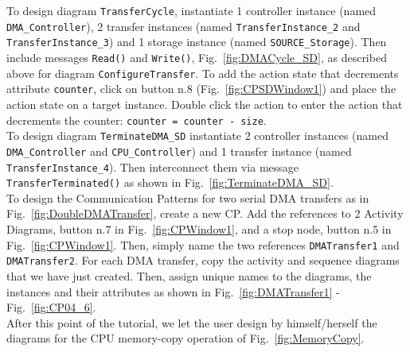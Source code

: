 \documentclass{llncs}
\begin{document}
To design diagram \texttt{TransferCycle}, instantiate 1 controller instance (named \texttt{DMA\_Controller}), 2 transfer
instances (named \texttt{TransferInstance\_2} and \texttt{TransferInstance\_3}) and 1 storage instance (named
\texttt{SOURCE\_Storage}). Then include messages \texttt{Read()} and \texttt{Write()}, Fig.~\ref{fig:DMACycle_SD}, as
described above for diagram \texttt{ConfigureTransfer}. To add the action state that decrements attribute
\texttt{counter}, click on button n.8 (Fig.~\ref{fig:CPSDWindow1}) and place the action state on a target instance.
Double click the action to enter the action that decrements the counter: \texttt{counter = counter - size}.\\
%
To design diagram \texttt{TerminateDMA\_SD} instantiate 2 controller instances (named \texttt{DMA\_Controller} and
\texttt{CPU\_Controller}) and 1 transfer instance (named \texttt{TransferInstance\_4}). Then interconnect them via
message \texttt{TransferTerminated()} as shown in Fig.~\ref{fig:TerminateDMA_SD}.\\
%

\noindent
To design the Communication Patterns for two serial DMA transfers as in Fig.~\ref{fig:DoubleDMATransfer}, create a new
CP. Add the references to 2 Activity Diagrams, button n.7 in Fig.~\ref{fig:CPWindow1}, and a stop node, button n.5 in
Fig.~\ref{fig:CPWindow1}. Then, simply name the two references \texttt{DMATransfer1} and \texttt{DMATransfer2}. For
each DMA transfer, copy the activity and sequence diagrams that we have just created. Then, assign unique names to the
diagrams, the instances and their attributes as shown in Fig.~\ref{fig:DMATransfer1} - Fig.~\ref{fig:CP04_6}.\\
%
After this point of the tutorial, we let the user design by himself/herself the diagrams for the CPU memory-copy operation
of Fig.~\ref{fig:MemoryCopy}.\\
%
\newpage
\end{document}
